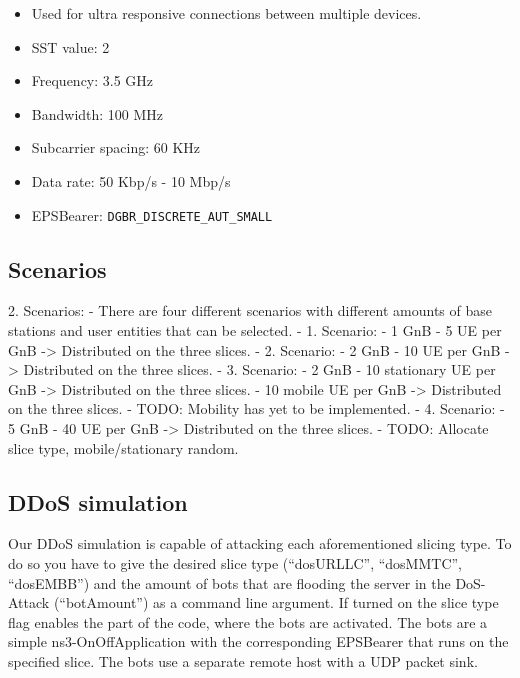 \begin{itemize}
        \begin{itemize}
            \item Used for ultra responsive connections between multiple devices.
            \item SST value: 2
            \item Frequency: 3.5 GHz
            \item Bandwidth: 100 MHz
            \item Subcarrier spacing: 60 KHz
            \item Data rate: 50 Kbp/s - 10 Mbp/s
            \item EPSBearer: \verb!DGBR_DISCRETE_AUT_SMALL!
        \end{itemize}
    \end{itemize}
    
    \subsection{Scenarios}
    
    2. Scenarios:
    - There are four different scenarios with different amounts of base stations and user entities that can be selected.
    - 1. Scenario:
	    - 1 GnB
	    - 5 UE per GnB -> Distributed on the three slices.
    - 2. Scenario:
	    - 2 GnB
	    - 10 UE per GnB -> Distributed on the three slices.
    - 3. Scenario:
	    - 2 GnB
	    - 10 stationary UE per GnB ->  Distributed on the three slices.
	    - 10 mobile UE per GnB -> Distributed on the three slices.
        - TODO: Mobility has yet to be implemented.
    - 4. Scenario:
	    - 5 GnB
	    - 40 UE per GnB -> Distributed on the three slices.
        - TODO: Allocate slice type, mobile/stationary random.
    
    \subsection{DDoS simulation}
    Our DDoS simulation is capable of attacking each aforementioned slicing type. To do so you have to give the desired slice type (``dosURLLC'', ``dosMMTC'', ``dosEMBB'') and the amount of bots that are flooding the server in the DoS-Attack (``botAmount'') as a command line argument. If turned on the slice type flag enables the part of the code, where the bots are activated. 
    The bots are a simple ns3-OnOffApplication with the corresponding EPSBearer that runs on the specified slice.
    The bots use a separate remote host with a UDP packet sink.    